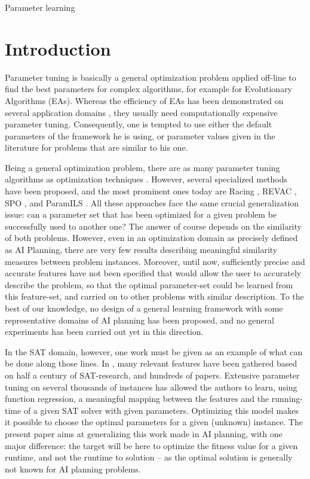 \documentclass{MYsig-alternate}
\begin{document}
 {Parameter learning}





\section{Introduction}

Parameter tuning is basically a general optimization problem applied off-line to find the best parameters for complex algorithms, for example for Evolutionary Algorithms (EAs). Whereas the efficiency of EAs has been demonstrated on several application domains \cite{practice08,ParameterSettingBook07}, they usually need computationally expensive parameter tuning. Consequently, one is tempted to use either the default parameters of the framework he is using, or parameter values given in the literature for problems that are similar to his one. 

Being a general optimization problem, there are as many parameter tuning algorithms as optimization techniques \cite{Eiben2007,Montero:2010}. However, several specialized methods have been proposed, and the most prominent ones today are Racing \cite{birattari2002}, REVAC \cite{Nannen07}, SPO \cite{SPO:CEC05}, and ParamILS \cite{ParamILS-JAIR}. All these approaches face the same crucial generalization issue: can a parameter set that has been optimized for a given problem be successfully used to another one? The answer of course depends on the similarity of both problems. However, even in an optimization domain as precisely defined as AI Planning, there are very few results describing meaningful similarity measures between problem instances. Moreover, until now, sufficiently precise and accurate features have not been specified that would allow the user to accurately describe the problem, so that the optimal parameter-set could be learned from this feature-set, and carried on to other problems with similar description. To the best of our knowledge, no design of a general learning framework with some representative domains of AI planning has been proposed, and no general experiments has been carried out yet in this direction.

In the SAT domain, however, one work must be given as an example of what can be done along those lines. In \cite{Hutter06}, many relevant features have been gathered based on half a century of SAT-research, and hundreds of papers. Extensive parameter tuning on several thousands of instances has allowed the authors to learn, using function regression, a meaningful mapping between the features and the running-time of a given SAT solver with given parameters. Optimizing this model makes it possible to choose the optimal parameters for a given (unknown) instance. The present paper aims at generalizing this work made in AI planning, with one major difference: the target will be here to optimize the fitness value for a given runtime, and not the runtime to solution -- as the optimal solution is generally not known for AI planning problems. 
\end{document}

